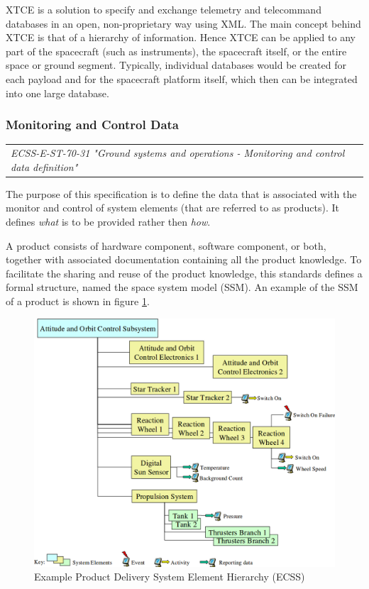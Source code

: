 XTCE is a solution to specify and exchange telemetry and telecommand databases in an open, non-proprietary way using XML. The main concept behind XTCE is that of a hierarchy of information. Hence XTCE can be applied to any part of the spacecraft (such as instruments), the spacecraft itself, or the entire space or ground segment. Typically, individual databases would be created for each payload and for the spacecraft platform itself, which then can be integrated into one large database. 

\subsubsection{Monitoring and Control Data}

\begin{tabular}{l}
\textit{ECSS-E-ST-70-31 "Ground systems and operations - Monitoring and control data definition" \cite{ECSS-E-ST-70-31}} \\
\end{tabular}

The purpose of this specification is to define the data that is associated with the monitor and control of system elements (that are referred to as products). It defines \textsl{what} is to be provided rather then \textsl{how}.

A product consists of hardware component, software component, or both, together with associated documentation containing all the product knowledge. To facilitate the sharing and reuse of the product knowledge, this standards defines a formal structure, named the space system model (SSM). An example of the SSM of a product is shown in figure \ref{fig:Example Product Delivery System Element Hierarchy}.

\begin{figure}[h]
\centering\includegraphics[scale=0.35]{fig/example_product_delivery_system_element_hierarchy}
\caption{Example Product Delivery System Element Hierarchy (ECSS)}
\label{fig:Example Product Delivery System Element Hierarchy}
\end{figure}

